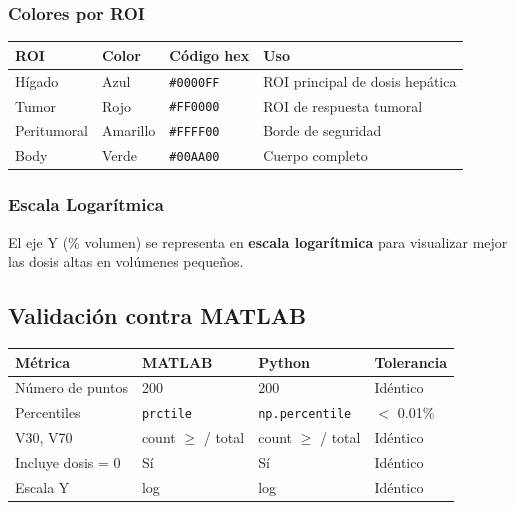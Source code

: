 \documentclass[12pt,a4paper]{article}
\begin{document}
\subsubsection{Colores por ROI}

\begin{tabular}{p{3cm} p{3cm} p{3cm} p{5cm}}
\toprule
\textbf{ROI} & \textbf{Color} & \textbf{Código hex} & \textbf{Uso} \\
\midrule
Hígado & Azul & \texttt{\#0000FF} & ROI principal de dosis hepática \\
Tumor & Rojo & \texttt{\#FF0000} & ROI de respuesta tumoral \\
Peritumoral & Amarillo & \texttt{\#FFFF00} & Borde de seguridad \\
Body & Verde & \texttt{\#00AA00} & Cuerpo completo \\
\bottomrule
\end{tabular}

\subsubsection{Escala Logarítmica}

El eje Y (\% volumen) se representa en \textbf{escala logarítmica} para visualizar mejor las dosis altas en volúmenes pequeños.

\subsection{Validación contra MATLAB}

\begin{tabular}{p{4cm} p{2.5cm} p{2.5cm} p{2.5cm}}
\toprule
\textbf{Métrica} & \textbf{MATLAB} & \textbf{Python} & \textbf{Tolerancia} \\
\midrule
Número de puntos & 200 & 200 & Idéntico \\
Percentiles & \texttt{prctile} & \texttt{np.percentile} & $<$ 0.01\% \\
V30, V70 & count $\geq$ / total & count $\geq$ / total & Idéntico \\
Incluye dosis = 0 & Sí & Sí & Idéntico \\
Escala Y & log & log & Idéntico \\
\bottomrule
\end{tabular}
\end{document}
